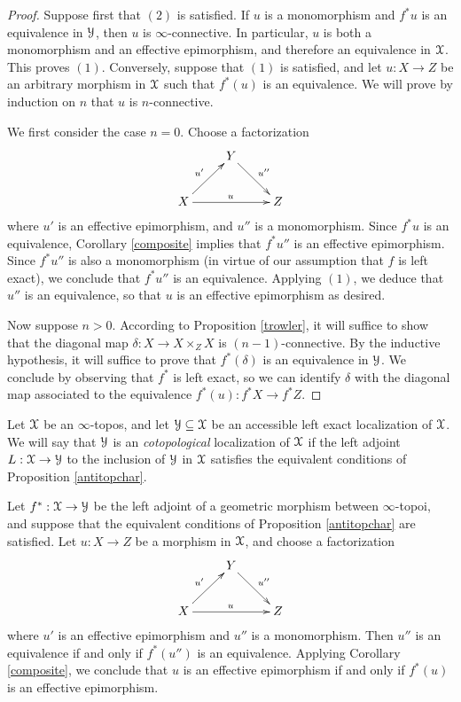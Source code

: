\begin{proof}
Suppose first that $(2)$ is satisfied. If $u$ is a monomorphism and $f^{\ast} u$ is an equivalence in $\operatorname{\mathcal{Y}}$, then $u$ is $\infty$-connective. In particular, $u$ is both a monomorphism and an effective epimorphism, and therefore an equivalence in $\operatorname{\mathcal{X}}$. This proves $(1)$. Conversely, suppose that $(1)$ is satisfied, and let $u: X \rightarrow Z$ be an arbitrary morphism in $\operatorname{\mathcal{X}}$ such
that $f^{\ast}(u)$ is an equivalence. We will prove by induction on $n$ that $u$ is $n$-connective.

We first consider the case $n=0$. Choose a factorization
$$ \xymatrix{ & Y \ar[dr]^{u''} & \\
X \ar[ur]^{u'} \ar[rr]^{u} & & Z }$$
where $u'$ is an effective epimorphism, and $u''$ is a monomorphism. Since
$f^{\ast} u$ is an equivalence, Corollary \ref{composite} implies that $f^{\ast} u''$
is an effective epimorphism. Since $f^{\ast} u''$ is also a monomorphism (in virtue of our
assumption that $f$ is left exact), we conclude that $f^{\ast} u''$ is an equivalence.
Applying $(1)$, we deduce that $u''$ is an equivalence, so that $u$ is an effective epimorphism as desired.

Now suppose $n > 0$. According to Proposition \ref{trowler}, it will suffice to show that the
diagonal map $\delta: X \rightarrow X \times_{Z} X$ is $(n-1)$-connective. By the inductive hypothesis, it will suffice to prove that $f^{\ast}(\delta)$ is an equivalence in $\operatorname{\mathcal{Y}}$. We conclude by observing that 
$f^{\ast}$ is left exact, so we can identify $\delta$ with the diagonal map associated to
the equivalence $f^{\ast}(u): f^{\ast} X \rightarrow f^{\ast} Z$.
\end{proof}

\begin{definition}
Let $\operatorname{\mathcal{X}}$ be an $\infty$-topos, and let $\operatorname{\mathcal{Y}} \subseteq \operatorname{\mathcal{X}}$ be an accessible
left exact localization of $\operatorname{\mathcal{X}}$. We will say that $\operatorname{\mathcal{Y}}$ is an {\em cotopological} localization
of $\operatorname{\mathcal{X}}$ if the left adjoint $L: \operatorname{\mathcal{X}} \rightarrow \operatorname{\mathcal{Y}}$ to the inclusion of $\operatorname{\mathcal{Y}}$ in $\operatorname{\mathcal{X}}$
satisfies the equivalent conditions of Proposition \ref{antitopchar}.
\end{definition}

\begin{remark}\label{sorkum}
Let $f^{\ast}: \operatorname{\mathcal{X}} \rightarrow \operatorname{\mathcal{Y}}$ be the left adjoint of a geometric morphism between $\infty$-topoi, and suppose that the equivalent conditions of Proposition \ref{antitopchar} are satisfied.
Let $u: X \rightarrow Z$ be a morphism in $\operatorname{\mathcal{X}}$, and choose a factorization
$$ \xymatrix{ & Y \ar[dr]^{u''} & \\
X \ar[ur]^{u'} \ar[rr]^{u} & & Z }$$
where $u'$ is an effective epimorphism and $u''$ is a monomorphism. Then
$u''$ is an equivalence if and only if $f^{\ast}(u'')$ is an equivalence. Applying
Corollary \ref{composite}, we conclude that $u$ is an effective epimorphism if and only if
$f^{\ast}(u)$ is an effective epimorphism.
\end{remark}

